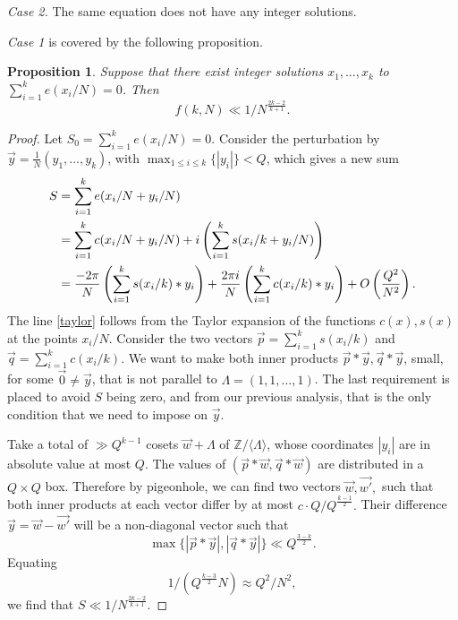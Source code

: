 \documentclass[12pt]{article}
\newtheorem{proposition}{Proposition}
\theoremstyle{definition}
\newcommand{\Z}{\mathbb{Z}}
\begin{document}
\textit{Case 2.} The same equation does not have any integer solutions.

\textit{Case 1} is covered by the following proposition.
\begin{proposition}
    Suppose that there exist integer solutions $x_1,\dots,x_k$ to $\sum_{i=1}^ke(x_i/N)=0$. Then
    $$ f(k,N)\ll 1/N^{\frac{2k-2}{k+1}}  .$$
\end{proposition}
\begin{proof}
    Let $S_0=\sum_{i=1}^k e(x_i/N)=0 $. Consider the perturbation by $\vec{y}=\frac{1}{N}(y_1,\dots,y_k)$, with $\max_{1\leq i\leq k}\{|y_i|\}<Q$, which gives a new sum
    \begin{align}
        S&=\sum_{i=1}^k e(x_i/N+y_i/N)\notag\\
        &=\sum_{i=1}^k c(x_i/N+y_i/N)+i\left(\sum_{i=1}^k s(x_i/k+y_i/N)  \right)\notag\\
        &=\frac{-2\pi}{N}\left( \sum_{i=1}^k s(x_i/k)*y_i \right)+\frac{2\pi i}{N}\left( \sum_{i=1}^kc(x_i/k)*y_i  \right)+O\left( \frac{Q^2}{N^2} \right).\label{taylor}
    \end{align}
    The line \eqref{taylor} follows from the Taylor expansion of the functions $c(x),s(x)$ at the points $x_i/N$. Consider the two vectors $\vec{p}=\sum_{i=1}^k s(x_i/k)$ and $\vec{q}=\sum_{i=1}^k c(x_i/k)$. We want to make both inner products $\vec{p}*\vec{y}, \vec{q}*\vec{y}$, small, for some $\vec{0}\neq\vec{y}$, that is not parallel to $\Lambda=(1,1,\dots,1)$. The last requirement is placed to avoid $S$ being zero, and from our previous analysis, that is the only condition that we need to impose on $\vec{y}.$

    Take a total of $\gg Q^{k-1}$ cosets $\vec{w}+\Lambda$ of $\Z/\langle \Lambda \rangle$, whose coordinates $|y_i|$ are in absolute value at most $Q$. The values of $(\vec{p}*\vec{w},\vec{q}*\vec{w})$ are distributed in a $Q\times Q$ box. Therefore by pigeonhole, we can find two vectors $\vec{w},\vec{w'},$ such that both inner products at each vector differ by at most $c\cdot Q/Q^{\frac{k-1}{2}}.$ Their difference $\vec{y}=\vec{w}-\vec{w'}$ will be a non-diagonal vector such that
    $$  \max\{ |\vec{p}*\vec{y}|, |\vec{q}*\vec{y}|  \}\ll Q^{\frac{3-k}{2}}.  $$
    Equating 
    $$  1/(Q^{\frac{k-3}{2}}N)\approx Q^2/N^2,  $$
    we find that $S\ll 1/N^{\frac{2k-2}{k+1}}. $
\end{proof}
\end{document}
